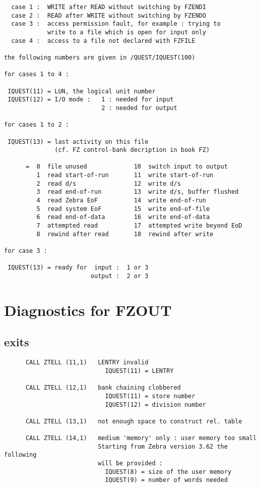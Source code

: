 \begin{verbatim}
  case 1 :  WRITE after READ without switching by FZENDI
  case 2 :  READ after WRITE without switching by FZENDO
  case 3 :  access permission fault, for example : trying to
            write to a file which is open for input only
  case 4 :  access to a file not declared with FZFILE

the following numbers are given in /QUEST/IQUEST(100)

for cases 1 to 4 :

 IQUEST(11) = LUN, the logical unit number
 IQUEST(12) = I/O mode :   1 : needed for input
                           2 : needed for output

for cases 1 to 2 :

 IQUEST(13) = last activity on this file
              (cf. FZ control-bank decription in book FZ)

      =  0  file unused             10  switch input to output
         1  read start-of-run       11  write start-of-run
         2  read d/s                12  write d/s
         3  read end-of-run         13  write d/s, buffer flushed
         4  read Zebra EoF          14  write end-of-run
         5  read system EoF         15  write end-of-file
         6  read end-of-data        16  write end-of-data
         7  attempted read          17  attempted write beyond EoD
         8  rewind after read       18  rewind after write

for case 3 :

 IQUEST(13) = ready for  input :  1 or 3
                        output :  2 or 3
\end{verbatim}

\section{Diagnostics for FZOUT}


\subsection*{ exits}

\begin{verbatim}
      CALL ZTELL (11,1)   LENTRY invalid
                            IQUEST(11) = LENTRY

      CALL ZTELL (12,1)   bank chaining clobbered
                            IQUEST(11) = store number
                            IQUEST(12) = division number

      CALL ZTELL (13,1)   not enough space to construct rel. table

      CALL ZTELL (14,1)   medium 'memory' only : user memory too small
                          Starting from Zebra version 3.62 the following
                          will be provided :
                            IQUEST(8) = size of the user memory
                            IQUEST(9) = number of words needed
\end{verbatim}

